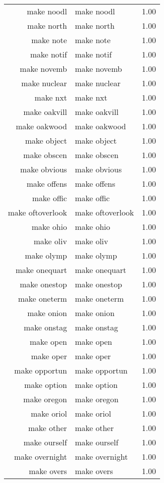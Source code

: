 \begin{table}[ht]
\begin{tabular}{rlr}
  make noodl & make noodl & 1.00 \\ 
  make north & make north & 1.00 \\ 
  make note & make note & 1.00 \\ 
  make notif & make notif & 1.00 \\ 
  make novemb & make novemb & 1.00 \\ 
  make nuclear & make nuclear & 1.00 \\ 
  make nxt & make nxt & 1.00 \\ 
  make oakvill & make oakvill & 1.00 \\ 
  make oakwood & make oakwood & 1.00 \\ 
  make object & make object & 1.00 \\ 
  make obscen & make obscen & 1.00 \\ 
  make obvious & make obvious & 1.00 \\ 
  make offens & make offens & 1.00 \\ 
  make offic & make offic & 1.00 \\ 
  make oftoverlook & make oftoverlook & 1.00 \\ 
  make ohio & make ohio & 1.00 \\ 
  make oliv & make oliv & 1.00 \\ 
  make olymp & make olymp & 1.00 \\ 
  make onequart & make onequart & 1.00 \\ 
  make onestop & make onestop & 1.00 \\ 
  make oneterm & make oneterm & 1.00 \\ 
  make onion & make onion & 1.00 \\ 
  make onstag & make onstag & 1.00 \\ 
  make open & make open & 1.00 \\ 
  make oper & make oper & 1.00 \\ 
  make opportun & make opportun & 1.00 \\ 
  make option & make option & 1.00 \\ 
  make oregon & make oregon & 1.00 \\ 
  make oriol & make oriol & 1.00 \\ 
  make other & make other & 1.00 \\ 
  make ourself & make ourself & 1.00 \\ 
  make overnight & make overnight & 1.00 \\ 
  make overs & make overs & 1.00 \\ 

\end{tabular}
\end{table}
